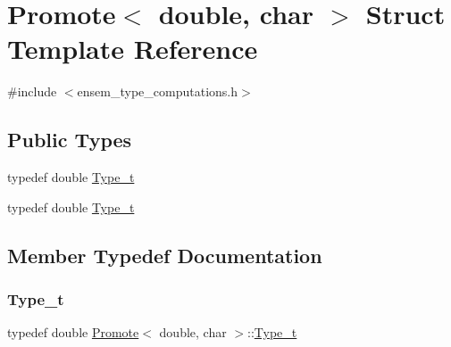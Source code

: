 \hypertarget{structPromote_3_01double_00_01char_01_4}{}\section{Promote$<$ double, char $>$ Struct Template Reference}
\label{structPromote_3_01double_00_01char_01_4}


{\ttfamily \#include $<$ensem\+\_\+type\+\_\+computations.\+h$>$}

\subsection*{Public Types}
\begin{DoxyCompactItemize}
\item 
typedef double \mbox{\hyperlink{structPromote_3_01double_00_01char_01_4_a9eda575d7d1de94d1933944cf245dc9f}{Type\+\_\+t}}
\item 
typedef double \mbox{\hyperlink{structPromote_3_01double_00_01char_01_4_a9eda575d7d1de94d1933944cf245dc9f}{Type\+\_\+t}}
\end{DoxyCompactItemize}


\subsection{Member Typedef Documentation}
\mbox{\label{structPromote_3_01double_00_01char_01_4_a9eda575d7d1de94d1933944cf245dc9f}} 
\subsubsection{\texorpdfstring{Type\_t}{Type\_t}\hspace{0.1cm}{\footnotesize\ttfamily [1/2]}}
{\footnotesize\ttfamily typedef double \mbox{\hyperlink{structPromote}{Promote}}$<$ double, char $>$\+::\mbox{\hyperlink{structPromote_3_01double_00_01char_01_4_a9eda575d7d1de94d1933944cf245dc9f}{Type\+\_\+t}}}

\mbox{\label{structPromote_3_01double_00_01char_01_4_a9eda575d7d1de94d1933944cf245dc9f}} 
